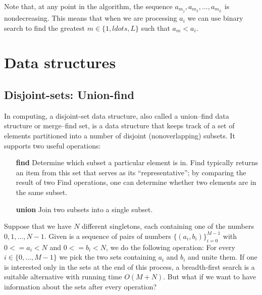 \documentclass[a4paper, twoside,openany]{book}
\newcommand{\insertcode}[2]{\begin{itemize}\item[]\end{itemize}} %
\begin{document}
Note that, at any point in the algorithm, the sequence $a_{m_j}, a_{m_2}, \ldots, a_{m_L}$
is nondecreasing. This means that when we are processing $a_i$ we can use binary search to find the greatest $m \in \{ 1, ldots, L \}$ such that $a_m < a_i$.


\insertcode{"codes/longest_increasing_subsequence.cpp"}{algorithm}

\chapter{Data structures}
\section{Disjoint-sets: Union-find}
\label{union-find}
In computing, a disjoint-set data structure, also called a union–find data structure or merge–find set, is a data structure that keeps track of a set of elements partitioned into a number of disjoint (nonoverlapping) subsets. It supports two useful operations:
\begin{enumerate}
\item[\bf find] Determine which subset a particular element is in. Find typically returns an item from this set that serves as its ``representative''; by comparing the result of two Find operations, one can determine whether two elements are in the same subset.
\item[\bf union] Join two subsets into a single subset.
\end{enumerate}

Suppose that we have $N$ different singletons, each containing one of the numbers $0, 1, \ldots, N-1$. Given is a sequence of pairs of numbers $\{(a_i, b_i)\}_{i=0}^{M-1}$ with $0 <= a_i <  N$ and $0 <= b_i <  N$, we do the following operation: For every $i \in \{0, \ldots, M-1\}$ we pick the two sets containing $a_i$ and $b_i$ and unite them. If one is interested only in the sets at the end of this process, a breadth-first search is a suitable alternative with running time $O(M+N)$. But what if we want to have information about the sets after every operation?

\insertcode{"codes/union_find.cpp"}{A union-find algorithm with only \emph{path compression}.}

\insertcode{"codes/union_find_rank.cpp"}{A union-find algorithm with \emph{path compression} and \emph{union by rank}.}
\end{document}
